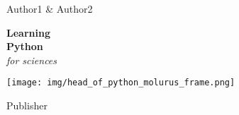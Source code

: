
\vspace*{\baselineskip} 

\centering  
{\Large Author1 \& Author2}
\vspace*{0.167\textheight} 

\raggedleft
\textbf{\fontsize{30}{36}\selectfont Learning}\\[\baselineskip] 
\textbf{\textcolor{pythonblue}{\fontsize{50}{60}\selectfont Python}}\\[\baselineskip]  
\textcolor{pythonyellow}{\fontsize{30}{36}\selectfont \textit{for sciences}}

\vspace*{0.1\textheight} 

\centering
\texttt{[image: img/head\_of\_python\_molurus\_frame.png]}

\vfill 

{\large Publisher} 